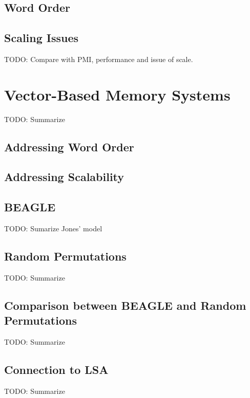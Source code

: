\documentclass[man]{apa6}
\begin{document}
\subsection{Word Order}

\subsection{Scaling Issues}

TODO: Compare with PMI, performance and issue of scale. \cite{Budiu2007}

\section{Vector-Based Memory Systems}

TODO: Summarize \cite{Plate1995}

\subsection{Addressing Word Order}

\subsection{Addressing Scalability}

\subsection{BEAGLE}

TODO: Sumarize Jones' model \cite{Jones2007}

\subsection{Random Permutations}

TODO: Summarize \cite{Sahlgren2008}

\subsection{Comparison between BEAGLE and Random Permutations}

TODO: Summarize \cite{Recchia2010}

\subsection{Connection to LSA}

TODO: Summarize \cite{Kanerva2000}
\end{document}
